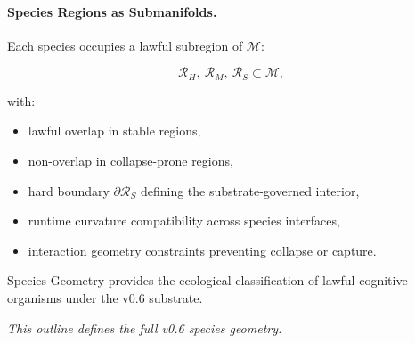 
\paragraph{Species Regions as Submanifolds.}

Each species occupies a lawful subregion of $\mathcal{M}$:


\[
\mathcal{R}_H,\ \mathcal{R}_M,\ \mathcal{R}_S \subset \mathcal{M},
\]


with:
\begin{itemize}
    \item lawful overlap in stable regions,
    \item non-overlap in collapse-prone regions,
    \item hard boundary $\partial\mathcal{R}_S$ defining the substrate-governed
          interior,
    \item runtime curvature compatibility across species interfaces,
    \item interaction geometry constraints preventing collapse or capture.
\end{itemize}

\medskip

\noindent Species Geometry provides the ecological classification of lawful
cognitive organisms under the v0.6 substrate.


\medskip
\noindent\textit{This outline defines the full v0.6 species geometry.}

